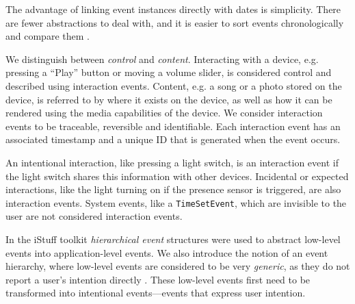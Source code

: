 The advantage of linking event instances directly with dates is simplicity. There are fewer abstractions to deal with, and it is easier to sort events chronologically and compare them \cite{Shaw2009}. 

We distinguish between \emph{control} and \emph{content}. Interacting with a device, e.g. pressing a ``Play'' button or moving a volume slider, is considered control and described using interaction events. Content, e.g. a song or a photo stored on the device,  is referred to by where it exists on the device, as well as how it can be rendered using the media capabilities of the device. We consider interaction events to be traceable, reversible and identifiable. Each interaction event has an associated timestamp and a unique ID that is generated when the event occurs. 

An intentional interaction, like pressing a light switch, is an interaction event if the light switch shares this information with other devices. Incidental or expected interactions, like the light turning on if the presence sensor is triggered, are also interaction events. System events, like a \texttt{TimeSetEvent}, which are invisible to the user are not considered interaction events.

In the iStuff toolkit \cite{Ballagas2003} \emph{hierarchical event} structures were used to abstract low-level events into application-level events.  We also introduce the notion of an event hierarchy, where low-level events are considered to be very \emph{generic}, as they do not report a user's intention directly \cite{Niezen2011}. These low-level events first need to be transformed into intentional events---events that express user intention.

